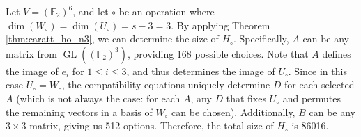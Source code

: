 \documentclass[runningheads,a4paper,english]{llncs}
\newcommand{\F}{\mathbb{F}}
\DeclareMathOperator{\gl}{GL}
\newcommand{\wo}{W_\circ}
\newcommand{\uo}{U_\circ}
\newcommand{\ho}{H_\circ}
\begin{document}
\begin{example}
	\label{ex:n6_d3_u3}
		Let $V = (\F_2)^6$, and let $\circ$ be an operation where $\dim(\wo) = \dim(\uo) = s-3 = 3$. By applying Theorem \ref{thm:caratt_ho_n3}, we can determine the size of $\ho$. Specifically, $A$ can be any matrix from $\gl((\F_2)^3)$, providing 168 possible choices. Note that $A$ defines the image of $e_i$ for $1 \leq i \leq 3$, and thus determines the image of $\uo$. Since in this case $\uo = \wo$, the compatibility equations uniquely determine $D$ for each selected $A$ (which is not always the case: for each $A$, any $D$ that fixes $\uo$ and permutes the remaining vectors in a basis of $\wo$ can be chosen). Additionally, $B$ can be any $3 \times 3$ matrix, giving us 512 options. Therefore, the total size of $\ho$ is 86016.
\end{example}
	
	
	
\end{document}
